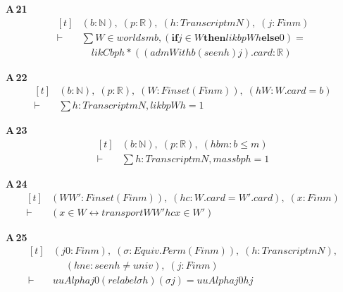 \noindent\textbf{A\,21}\quad{}
{\footnotesize\[ \begin{aligned}[t]
&(\mathit{b} : \mathbb{N} ),\; (\mathit{p} : \mathbb{R} ),\; (\mathit{h} : \mathit{Transcript} \mathit{m} \mathit{N}),\; (\mathit{j} : \mathit{Fin} \mathit{m})\\
\vdash\;&\textstyle\sum \mathit{W} \in \mathit{worlds} \mathit{m} \mathit{b}, (\mathbf{if} \mathit{j} \in \mathit{W} \mathbf{then} \mathit{lik} \mathit{b} \mathit{p} \mathit{W} \mathit{h} \mathbf{else} 0) =\\
&\quad \mathit{likC} \mathit{b} \mathit{p} \mathit{h} * ((\mathit{admWith} \mathit{b} (\mathit{seen} \mathit{h}) \mathit{j}).\mathit{card} : \mathbb{R} )
\end{aligned} \]}

\noindent\textbf{A\,22}\quad{}
{\footnotesize\[ \begin{aligned}[t]
&(\mathit{b} : \mathbb{N} ),\; (\mathit{p} : \mathbb{R} ),\; (\mathit{W} : \mathit{Finset} (\mathit{Fin} \mathit{m})),\; (\mathit{hW} : \mathit{W}.\mathit{card} = \mathit{b})\\
\vdash\;&\textstyle\sum \mathit{h} : \mathit{Transcript} \mathit{m} \mathit{N}, \mathit{lik} \mathit{b} \mathit{p} \mathit{W} \mathit{h} = 1
\end{aligned} \]}

\noindent\textbf{A\,23}\quad{}
{\footnotesize\[ \begin{aligned}[t]
&(\mathit{b} : \mathbb{N} ),\; (\mathit{p} : \mathbb{R} ),\; (\mathit{hbm} : \mathit{b} \leq \mathit{m})\\
\vdash\;&\textstyle\sum \mathit{h} : \mathit{Transcript} \mathit{m} \mathit{N}, \mathit{mass} \mathit{b} \mathit{p} \mathit{h} = 1
\end{aligned} \]}

\noindent\textbf{A\,24}\quad{}
{\footnotesize\[ \begin{aligned}[t]
&(\mathit{W} \mathit{W'} : \mathit{Finset} (\mathit{Fin} \mathit{m})),\; (\mathit{hc} : \mathit{W}.\mathit{card} = \mathit{W'}.\mathit{card}),\; (\mathit{x} : \mathit{Fin} \mathit{m})\\
\vdash\;&(\mathit{x} \in \mathit{W} \leftrightarrow \mathit{transport} \mathit{W} \mathit{W'} \mathit{hc} \mathit{x} \in \mathit{W'})
\end{aligned} \]}

\noindent\textbf{A\,25}\quad{}
{\footnotesize\[ \begin{aligned}[t]
&(\mathit{j0} : \mathit{Fin} \mathit{m}),\; (\sigma : \mathit{Equiv}.\mathit{Perm} (\mathit{Fin} \mathit{m})),\; (\mathit{h} : \mathit{Transcript} \mathit{m} \mathit{N}),\\
&\quad \; (\mathit{hne} : \mathit{seen} \mathit{h} \neq \mathit{univ}),\; (\mathit{j} : \mathit{Fin} \mathit{m})\\
\vdash\;&\mathit{uuAlpha} \mathit{j0} (\mathit{relabel} \sigma \mathit{h}) (\sigma \mathit{j}) = \mathit{uuAlpha} \mathit{j0} \mathit{h} \mathit{j}
\end{aligned} \]}

